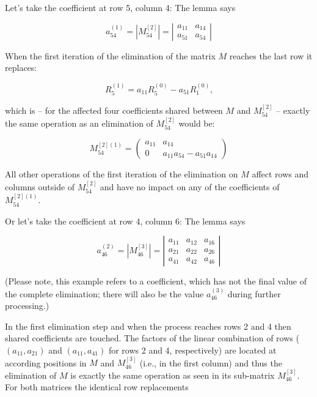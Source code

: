 \noindent
Let's take the coefficient at row 5, column 4: The lemma says

\begin{equation*}
a^{(1)}_{54} = \left| M^{[2]}_{54} \right| =
\left|
\begin{array}{cc}
a_{11} & a_{14} \\
a_{51} & a_{54}
\end{array}
\right|
\end{equation*}

\noindent
When the first iteration of the elimination of the matrix $M$ reaches the
last row it replaces:

\begin{equation*}
R^{(1)}_{5} = a_{11} R^{(0)}_{5} - a_{51} R^{(0)}_{1} \text{,}
\end{equation*}

\noindent
which is -- for the affected four coefficients shared between $M$ and
$M^{[2]}_{54}$ -- exactly the same operation as an elimination of
$M^{[2]}_{54}$ would be:

\begin{equation*}
M^{[2](1)}_{54} =
\left(
\begin{array}{cc}
a_{11} & a_{14} \\
0      & a_{11} a_{54} - a_{51} a_{14}
\end{array}
\right)
\end{equation*}

\noindent
All other operations of the first iteration of the
elimination on $M$ affect rows and columns outside of $M^{[2]}_{54}$ and have no
impact on any of the coefficients of $M^{[2](1)}_{54}$.

Or let's take the coefficient at row 4, column 6: The lemma says

\begin{equation*}
a^{(2)}_{46} = \left| M^{[3]}_{46} \right| =
\left|
\begin{array}{ccc}
a_{11} & a_{12} & a_{16} \\
a_{21} & a_{22} & a_{26} \\
a_{41} & a_{42} & a_{46}
\end{array}
\right|
\end{equation*}

\noindent
(Please note, this example refers to a coefficient, which has not the
final value of the complete elimination; there will also be the value
$a^{(3)}_{46}$ during further processing.)

In the first elimination step and when the process reaches rows 2 and 4
then shared coefficients are touched. The factors of the linear
combination of rows ($(a_{11}, a_{21})$ and $(a_{11}, a_{41})$ for rows 2
and 4, respectively) are located at according positions in $M$ and
$M^{[3]}_{46}$ (i.e., in the first column) and thus the elimination of $M$
is exactly the same operation as seen in its sub-matrix $M^{[3]}_{46}$.
For both matrices the identical row replacements

